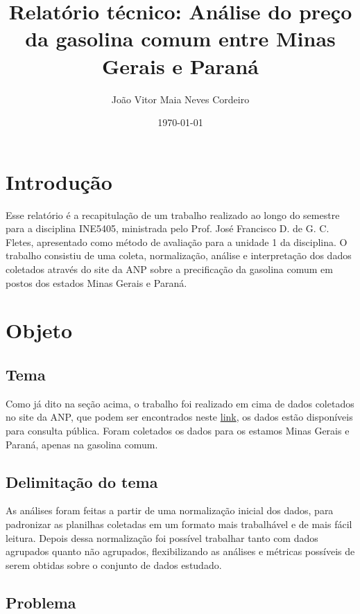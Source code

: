 \documentclass[12pt]{article}
\author{João Vitor Maia Neves Cordeiro}
\title{Relatório técnico: Análise do preço da gasolina comum entre Minas Gerais e Paraná}
\date{\today}
\begin{document}
\maketitle

\tableofcontents

\section{Introdução}

Esse relatório é a recapitulação de um trabalho realizado ao longo do semestre para a disciplina INE5405, ministrada pelo Prof. José Francisco D. de G. C. Fletes, apresentado como método de avaliação para a unidade 1 da disciplina. O trabalho consistiu de uma coleta, normalização, análise e interpretação dos dados coletados através do site da ANP sobre a precificação da gasolina comum em postos dos estados Minas Gerais e Paraná.

\section{Objeto}

\subsection{Tema}

Como já dito na seção acima, o trabalho foi realizado em cima de dados coletados no site da ANP, que podem ser encontrados neste \href{https://preco.anp.gov.br/include/Resumo_Por_Estado_Index.asp}{link}, os dados estão disponíveis para consulta pública. Foram coletados os dados para os estamos Minas Gerais e Paraná, apenas na gasolina comum.

\subsection{Delimitação do tema}

As análises foram feitas a partir de uma normalização inicial dos dados, para padronizar as planilhas coletadas em um formato mais trabalhável e de mais fácil leitura. Depois dessa normalização foi possível trabalhar tanto com dados agrupados quanto não agrupados, flexibilizando as análises e métricas possíveis de serem obtidas sobre o conjunto de dados estudado.

\subsection{Problema}
\end{document}
